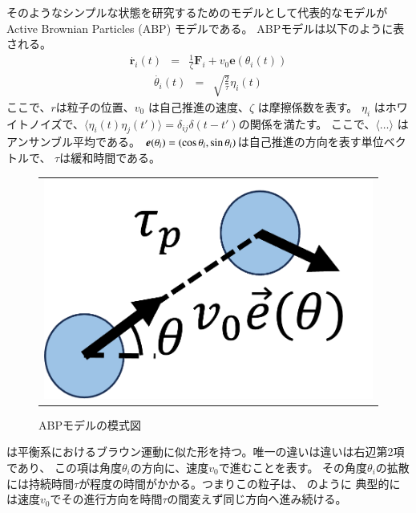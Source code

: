 \documentclass[/Users/ikedahajime/GitHub/reserch/master_report/thesis]{subfiles}
\begin{document}
そのようなシンプルな状態を研究するためのモデルとして代表的なモデルが Active Brownian Particles (ABP) モデルである。
ABPモデルは以下のように表される。
\begin{eqnarray}\label{eq:eom_abp_1}
    \dot{\bm{r}_i}(t)&=& \frac{1}{\zeta}\bm{F}_i + v_0 \bm{e}(\theta_i(t))
\end{eqnarray}
\begin{eqnarray}\label{eq:eom_abp_2}
    \dot{\theta_i }(t) &=& \sqrt{\frac{2}{\tau}}\eta_i(t)
\end{eqnarray}
ここで、\mbox{\boldmath$r$}は粒子の位置、$v_0$ は自己推進の速度、$\zeta$ は摩擦係数を表す。
$\eta_i$ はホワイトノイズで、$\langle \eta_i(t) \eta_j(t') \rangle=\delta_{ij}\delta(t-t')$の関係を満たす。
ここで、$\langle \dots \rangle$ はアンサンブル平均である。
$\mbox{\boldmath$e$}(\theta_i)=(\cos\theta_i,\sin \theta_i)$は自己推進の方向を表す単位ベクトルで、
$\tau$は緩和時間である。
\begin{figure}
    \centering
    \begin{tabular}{c}
        \begin{minipage}{0.7\hsize}
            \includegraphics[width=\textwidth]{img/intro/fig_abp_model.png}
        \end{minipage}
    \end{tabular}
    \caption[Four sample images]
    {
        ABPモデルの模式図
    }
    \label{fig:intro_saple_abp}
\end{figure}
は平衡系におけるブラウン運動に似た形を持つ。唯一の違いは違いは右辺第2項であり、
この項は角度$\theta_i$の方向に、速度$v_0$で進むことを表す。
その角度$\theta_i$の拡散には持続時間$\tau$が程度の時間がかかる。つまりこの粒子は、
のように
典型的には速度$v_0$でその進行方向を時間$\tau$の間変えず同じ方向へ進み続ける。
\end{document}
